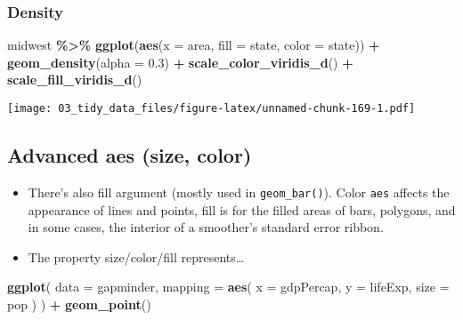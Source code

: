 \documentclass[
]{book}
\newenvironment{Shaded}{\begin{snugshade}}{\end{snugshade}}
\newcommand{\DataTypeTok}[1]{\textcolor[rgb]{0.13,0.29,0.53}{#1}}
\newcommand{\FloatTok}[1]{\textcolor[rgb]{0.00,0.00,0.81}{#1}}
\newcommand{\KeywordTok}[1]{\textcolor[rgb]{0.13,0.29,0.53}{\textbf{#1}}}
\newcommand{\NormalTok}[1]{#1}
\newcommand{\OperatorTok}[1]{\textcolor[rgb]{0.81,0.36,0.00}{\textbf{#1}}}
\newcommand{\StringTok}[1]{\textcolor[rgb]{0.31,0.60,0.02}{#1}}
\begin{document}
\hypertarget{density}{%
\subsubsection{Density}\label{density}}

\begin{Shaded}
\begin{Highlighting}[]
\NormalTok{midwest }\OperatorTok{\%\textgreater{}\%}
\StringTok{  }\KeywordTok{ggplot}\NormalTok{(}\KeywordTok{aes}\NormalTok{(}\DataTypeTok{x =}\NormalTok{ area, }\DataTypeTok{fill =}\NormalTok{ state, }\DataTypeTok{color =}\NormalTok{ state)) }\OperatorTok{+}
\StringTok{  }\KeywordTok{geom\_density}\NormalTok{(}\DataTypeTok{alpha =} \FloatTok{0.3}\NormalTok{) }\OperatorTok{+}
\StringTok{  }\KeywordTok{scale\_color\_viridis\_d}\NormalTok{() }\OperatorTok{+}
\StringTok{  }\KeywordTok{scale\_fill\_viridis\_d}\NormalTok{()}
\end{Highlighting}
\end{Shaded}

\texttt{[image: 03\_tidy\_data\_files/figure-latex/unnamed-chunk-169-1.pdf]}

\hypertarget{advanced-aes-size-color}{%
\subsection{Advanced aes (size, color)}\label{advanced-aes-size-color}}

\begin{itemize}
\item
  There's also fill argument (mostly used in \texttt{geom\_bar()}). Color \texttt{aes} affects the appearance of lines and points, fill is for the filled areas of bars, polygons, and in some cases, the interior of a smoother's standard error ribbon.
\item
  The property size/color/fill represents\ldots{}
\end{itemize}

\begin{Shaded}
\begin{Highlighting}[]
\KeywordTok{ggplot}\NormalTok{(}
  \DataTypeTok{data =}\NormalTok{ gapminder,}
  \DataTypeTok{mapping =} \KeywordTok{aes}\NormalTok{(}
    \DataTypeTok{x =}\NormalTok{ gdpPercap, }\DataTypeTok{y =}\NormalTok{ lifeExp,}
    \DataTypeTok{size =}\NormalTok{ pop}
\NormalTok{  )}
\NormalTok{) }\OperatorTok{+}
\StringTok{  }\KeywordTok{geom\_point}\NormalTok{()}
\end{Highlighting}
\end{Shaded}
\end{document}
